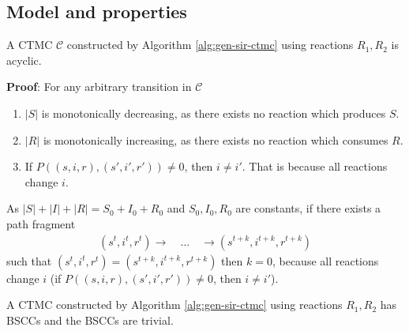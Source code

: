\subsection{Model and properties}
\begin{theorem}[Acyclicity]
    A CTMC $\mathcal{C}$ constructed by Algorithm \ref{alg:gen-sir-ctmc} using reactions
    $R_1, R_2$ is acyclic.
\end{theorem}
\noindent\textbf{Proof}: For any arbitrary transition in $\mathcal{C}$
\begin{enumerate}
    \item $|S|$ is monotonically decreasing, as there exists no reaction which produces $S$.
    \item $|R|$ is monotonically increasing, as there exists no reaction which consumes $R$.
    \item If $P((s,i,r), (s',i',r'))\neq 0$, then $i \neq i'$. That is because all reactions change $i$.
\end{enumerate}
As $|S| + |I| + |R| = S_0 + I_0 + R_0$ and $S_0,I_0,R_0$ are constants, if there exists a path fragment
\begin{align*}
    (s^t,i^t,r^t)\rightarrow \quad \ldots \quad \rightarrow(s^{t+k},i^{t+k},r^{t+k})
\end{align*}
such that $(s^t,i^t,r^t) = (s^{t+k},i^{t+k},r^{t+k})$ then $k=0$, because all reactions change $i$
(if $P((s,i,r), (s',i',r'))\neq 0$, then $i \neq i'$). \QED
\begin{corollary}
    A CTMC constructed by Algorithm \ref{alg:gen-sir-ctmc} using reactions $R_1, R_2$ has BSCCs
    and the BSCCs are trivial.
\end{corollary}

